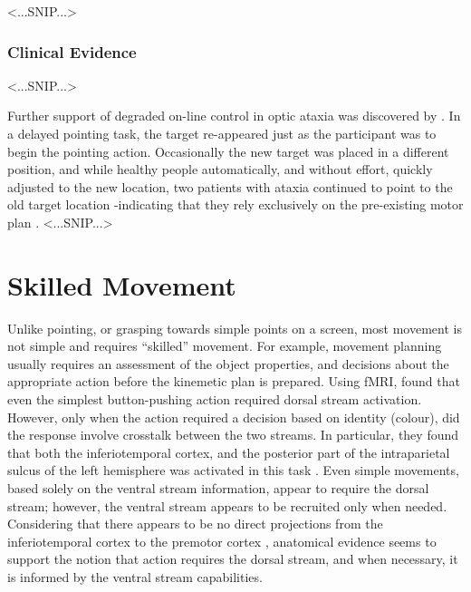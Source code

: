 <...SNIP...>  %



\subsubsection*{Clinical Evidence}
<...SNIP...>  %

Further support of degraded on-line control in optic ataxia was discovered by . In a delayed pointing task, the target re-appeared just as the participant was to begin the pointing action. Occasionally the new target was placed in a different position, and while healthy people automatically, and without effort, quickly adjusted to the new location, two patients with ataxia  continued to point to the old target location -indicating that they rely exclusively on the pre-existing motor plan \cite{rossetti2005}.
<...SNIP...>  %



\section*{Skilled Movement}
Unlike pointing, or grasping towards simple points on a screen, most movement is not simple and requires ``skilled'' movement. For example, movement planning usually requires an assessment of the object properties, and decisions about the appropriate action before the kinemetic plan is prepared. Using fMRI,  found that even the simplest button-pushing action required dorsal stream activation. However, only when the action required a decision based on identity (colour), did the response involve crosstalk between the two streams. In particular, they found that both the inferiotemporal cortex, and the posterior part of the intraparietal sulcus of the left hemisphere was activated in this task \cite{passingham2001cda}. Even simple movements, based solely on the ventral stream information, appear to require the dorsal stream; however, the ventral stream appears to be recruited only when needed. Considering that there appears to be no direct projections from the inferiotemporal cortex to the premotor cortex \cite{sereno1998}, anatomical evidence seems to support the notion that action requires the dorsal stream, and when necessary, it is informed by the ventral stream capabilities.


